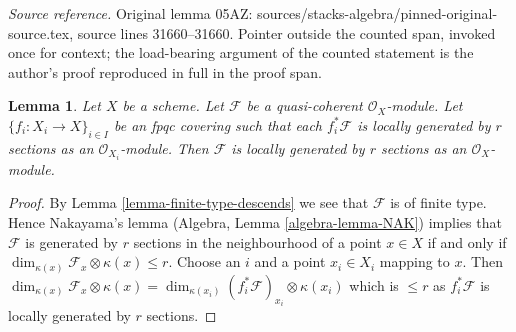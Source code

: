 \documentclass{stacks-project}
\theoremstyle{plain}
\newtheorem{lemma}[subsection]{Lemma}
\theoremstyle{definition}
\theoremstyle{remark}
\numberwithin{equation}{subsection}
\begin{document}
\noindent\textit{Source reference.} Original lemma 05AZ: sources/stacks-algebra/pinned-original-source.tex, source lines 31660--31660. Pointer outside the counted span, invoked once for context; the load-bearing argument of the counted statement is the author's proof reproduced in full in the proof span.\par\medskip
\begin{lemma}
\label{lemma-locally-generated-by-r-sections-descends}
Let $X$ be a scheme.
Let $\mathcal{F}$ be a quasi-coherent $\mathcal{O}_X$-module.
Let $\{f_i : X_i \to X\}_{i \in I}$ be an fpqc covering such that
each $f_i^*\mathcal{F}$ is locally generated by $r$ sections as an
$\mathcal{O}_{X_i}$-module. Then $\mathcal{F}$ is locally generated by
$r$ sections as an $\mathcal{O}_X$-module.
\end{lemma}

\begin{proof}
By Lemma \ref{lemma-finite-type-descends} we see that $\mathcal{F}$
is of finite type. Hence Nakayama's lemma
(Algebra, Lemma \ref{algebra-lemma-NAK}) implies that $\mathcal{F}$
is generated by $r$ sections in the neighbourhood of a point $x \in X$
if and only if $\dim_{\kappa(x)} \mathcal{F}_x \otimes \kappa(x) \leq r$.
Choose an $i$ and a point $x_i \in X_i$ mapping to $x$. Then
$\dim_{\kappa(x)} \mathcal{F}_x \otimes \kappa(x) = 
\dim_{\kappa(x_i)} (f_i^*\mathcal{F})_{x_i} \otimes \kappa(x_i)$
which is $\leq r$ as $f_i^*\mathcal{F}$ is locally generated by $r$
sections.
\end{proof}
\end{document}
